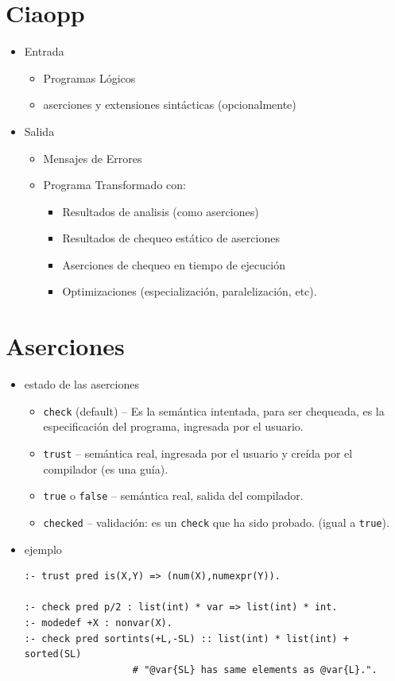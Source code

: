 \documentclass[11pt]{article}
\begin{document}
\section*{Ciaopp}
\label{sec:org1aeecb3}
\begin{itemize}
\item Entrada 
\begin{itemize}
\item Programas Lógicos
\item aserciones y extensiones sintácticas (opcionalmente)
\end{itemize}
\item Salida
\begin{itemize}
\item Mensajes de Errores
\item Programa Transformado con:
\begin{itemize}
\item Resultados de analisis (como aserciones)
\item Resultados de chequeo estático de aserciones
\item Aserciones de chequeo en tiempo de ejecución
\item Optimizaciones (especialización, paralelización, etc).
\end{itemize}
\end{itemize}
\end{itemize}


\section*{Aserciones}
\label{sec:orgce855f4}
\begin{itemize}
\item estado de las aserciones
\begin{itemize}
\item \texttt{check}  (default) -- Es la semántica intentada, para ser
chequeada, es la especificación del programa, ingresada por el usuario.
\item \texttt{trust} -- semántica real, ingresada por el usuario y creída por
el compilador (es una guía).
\item \texttt{true} o \texttt{false} -- semántica real, salida del compilador.
\item \texttt{checked} -- validación: es un \texttt{check} que ha sido probado. (igual
a \texttt{true}).
\end{itemize}
\item ejemplo
\begin{verbatim}
:- trust pred is(X,Y) => (num(X),numexpr(Y)).

:- check pred p/2 : list(int) * var => list(int) * int.
:- modedef +X : nonvar(X).
:- check pred sortints(+L,-SL) :: list(int) * list(int) + sorted(SL)
			       # "@var{SL} has same elements as @var{L}.".
\end{verbatim}
\end{itemize}
\end{document}
